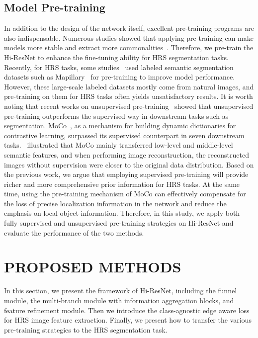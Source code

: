 \documentclass[journal]{IEEEtran}
\begin{document}
\subsection{Model Pre-training}
In addition to the design of the network itself, excellent pre-training programs are also indispensable. Numerous studies showed that applying pre-training can make models more stable and extract more commonalities~\cite{simonyan2014very,he2016deep,wang2022advancing,wang2022empirical,ayush2021geography}. Therefore, we pre-train the Hi-ResNet to enhance the fine-tuning ability for HRS segmentation tasks. Recently, for HRS tasks, some studies~\cite{workman2023handling,kong2020enhanced} used labeled semantic segmentation datasets such as Mapillary~\cite{neuhold2017mapillary} for pre-training to improve model performance. However, these large-scale labeled datasets mostly come from natural images, and pre-training on them for HRS tasks often yields unsatisfactory results. It is worth noting that recent works on unsupervised pre-training~\cite{khan2022transformers,chen2020simple,chen2020improved,he2020momentum,xu2021regioncl} showed that unsupervised pre-training outperforms the supervised way in downstream tasks such as segmentation.
MoCo~\cite{he2020momentum}, as a mechanism for building dynamic dictionaries for contrastive learning, surpassed its supervised counterpart in seven downstream tasks.~\cite{zhao2020makes} illustrated that MoCo mainly transferred low-level and middle-level semantic features, and when performing image reconstruction, the reconstructed images without supervision were closer to the original data distribution. Based on the previous work, we argue that employing supervised pre-training will provide richer and more comprehensive prior information for HRS tasks. At the same time, using the pre-training mechanism of MoCo can effectively compensate for the loss of precise localization information in the network and reduce the emphasis on local object information. Therefore, in this study, we apply both fully supervised and unsupervised pre-training strategies on Hi-ResNet and evaluate the performance of the two methods.


\section{PROPOSED METHODS}
In this section, we present the framework of Hi-ResNet, including the funnel module, the multi-branch module with information aggregation blocks, and feature refinement module. Then we introduce the class-agnostic edge aware loss for HRS image feature extraction. Finally, we present how to transfer the various pre-training strategies to the HRS segmentation task.
\end{document}
